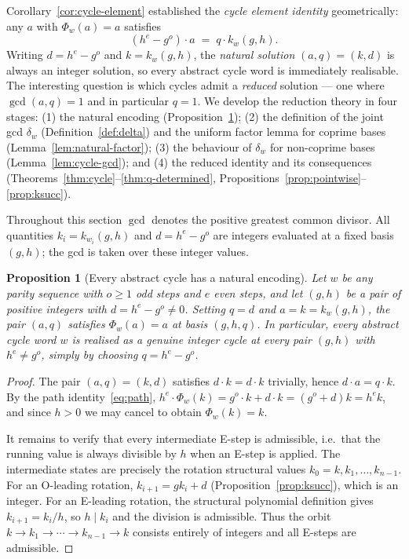 \documentclass[12pt]{article}
\newtheorem{proposition}[theorem]{Proposition}
\theoremstyle{definition}
\theoremstyle{remark}
\newcommand{\kpoly}{k}
\begin{document}
Corollary~\ref{cor:cycle-element} established the \emph{cycle element identity}
geometrically: any $a$ with $\Phi_w(a) = a$ satisfies
\begin{equation}
  \label{eq:cycle-intro}
  (h^e - g^o)\cdot a \;=\; q \cdot \kpoly_w(g,h).
\end{equation}
Writing $d = h^e - g^o$ and $k = \kpoly_w(g,h)$, the \emph{natural solution}
$(a,q) = (k,d)$ is always an integer solution, so every abstract cycle word
is immediately realisable.  The interesting question is which cycles admit a
\emph{reduced} solution — one where $\gcd(a,q) = 1$ and in particular $q=1$.
We develop the reduction theory in four stages: (1) the natural encoding
(Proposition~\ref{prop:natural-encoding}); (2) the definition of the joint
gcd $\delta_w$ (Definition~\ref{def:delta}) and the uniform factor lemma for
coprime bases (Lemma~\ref{lem:natural-factor}); (3) the behaviour of $\delta_w$
for non-coprime bases (Lemma~\ref{lem:cycle-gcd}); and (4) the reduced
identity and its consequences (Theorems~\ref{thm:cycle}--\ref{thm:q-determined},
Propositions~\ref{prop:pointwise}--\ref{prop:ksucc}).

Throughout this section $\gcd$ denotes the positive greatest common divisor.
All quantities $k_i = \kpoly_{w_i}(g,h)$ and $d = h^e - g^o$ are integers
evaluated at a fixed basis $(g,h)$; the gcd is taken over these integer values.

\begin{proposition}[Every abstract cycle has a natural encoding]
\label{prop:natural-encoding}
Let $w$ be any parity sequence with $o \geq 1$ odd steps and $e$ even steps,
and let $(g,h)$ be a pair of positive integers with $d = h^e - g^o \neq 0$.
Setting $q = d$ and $a = k = \kpoly_w(g,h)$, the pair $(a,q)$ satisfies
$\Phi_w(a) = a$ at basis $(g,h,q)$.  In particular, every abstract cycle
word $w$ is realised as a genuine integer cycle at every pair $(g,h)$ with
$h^e \neq g^o$, simply by choosing $q = h^e - g^o$.
\end{proposition}

\begin{proof}
The pair $(a,q) = (k,d)$ satisfies $d \cdot k = d \cdot k$ trivially,
hence $d \cdot a = q \cdot k$.  By the path identity~\eqref{eq:path},
$h^e \cdot \Phi_w(k) = g^o \cdot k + d \cdot k = (g^o + d) k = h^e k$,
and since $h > 0$ we may cancel to obtain $\Phi_w(k) = k$.

It remains to verify that every intermediate E-step is admissible,
i.e.\ that the running value is always divisible by $h$ when an E-step
is applied.  The intermediate states are precisely the rotation structural
values $k_0 = k, k_1, \ldots, k_{n-1}$.  For an O-leading rotation,
$k_{i+1} = g k_i + d$ (Proposition~\ref{prop:ksucc}), which is an
integer.  For an E-leading rotation, the structural polynomial definition gives
$k_{i+1} = k_i / h$, so $h \mid k_i$ and the division is admissible.  Thus the
orbit $k \to k_1 \to \cdots \to k_{n-1} \to k$ consists entirely of
integers and all E-steps are admissible.
\end{proof}
\end{document}
